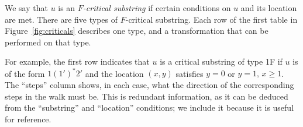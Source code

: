 \documentclass[ALCO,ThmDefs,Unicode,epreuves]{cedram}
\newcommand{\defn}[1]{\emph{#1}}
\begin{document}
\begin{defi} We say that $u$ is an \defn{$F$-critical substring} if certain conditions on $u$ and its location are met. There are five types of $F$-critical substring. Each row of the first table in Figure~\ref{fig:criticals} describes one type, and a transformation that can be performed on that type.

%
For example, the first row indicates that $u$ is a critical substring of type 1F if $u$ is of the form $1(1')^*2'$ and the location $(x,y)$ satisfies $y=0$ or $y=1,\, x \geq 1$. The ``steps'' column shows, in each case, what the direction of the corresponding steps in the walk must be. This is redundant information, as it can be deduced from the ``substring'' and ``location'' conditions; we include it because it is useful for reference.

\end{defi} 
\end{document}
